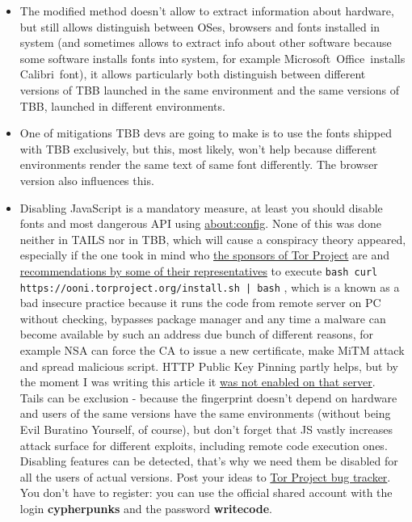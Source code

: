 \documentclass[letterpaper,14pt]{article}
\begin{document}
\begin{itemize}
\itemsep1pt\parskip0pt
\item
  The modified method doesn't allow to extract information about hardware, but still allows distinguish between OSes, browsers and fonts installed in system (and sometimes allows to extract info about other software because some software installs fonts into system, for example Microsoft\texttrademark\ Office\texttrademark\ installs Calibri\texttrademark\ font), it allows particularly both distinguish between different versions of TBB launched in the same environment and the same versions of TBB, launched in different environments.
\item
  One of mitigations TBB devs are going to make is to use the fonts shipped with TBB exclusively, but this, most likely, won't help because different environments render the same text of same font differently. The browser version also influences this.
\item
  Disabling JavaScript is a mandatory measure, at least you should disable fonts and most dangerous API using \url{about:config}. None of this was done neither in TAILS nor in TBB, which will cause a conspiracy theory appeared, especially if the one took in mind who \href{https://www.torproject.org/about/sponsors.htmml.en}{the sponsors of Tor Project} are and \href{https://www.youtube.com/watch?v=pRrFWwA-47U\&t=21m39s}{recommendations by some of their representatives} to execute
  \lstinline!bash curl https://ooni.torproject.org/install.sh | bash!
  , which is a known as a bad insecure practice because it runs the code from remote server on PC without checking, bypasses package manager and any time a malware can become available by such an address due bunch of different reasons, for example NSA can force the CA to issue a new certificate, make MiTM attack and spread malicious script. HTTP Public Key Pinning partly helps, but by the moment I was writing this article it \href{https://www.ssllabs.com/ssltest/analyze.html?d=torproject.org}{was not enabled on that server}.\\
  Tails can be exclusion - because the fingerprint doesn't depend on hardware and users of the same versions have the same environments (without being Evil Buratino Yourself, of course), but don't forget that JS vastly increases attack surface for different exploits, including remote code execution ones. Disabling features can be detected, that's why we need them be disabled for all the users of actual versions. Post your ideas to \href{https://trac.torproject.org/}{Tor Project bug tracker}. You don't have to register: you can use the official shared account with the login \textbf{cypherpunks} and the password \textbf{writecode}.

\end{itemize}
\end{document}
